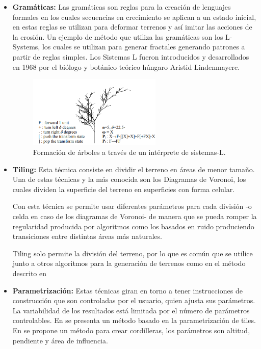 \begin{itemize}
            \item \textbf{Gramáticas:} 
            Las gramáticas son reglas para la creación de lenguajes formales en los cuales secuencias en crecimiento se aplican a un estado inicial, en \cite{Marak_97} estas reglas se utilizan para deformar terrenos y así imitar las acciones de la erosión.
            Un ejemplo de método que utiliza las gramáticas son los L-Systems, los cuales se utilizan para generar fractales generando patrones a partir de reglas simples. Los Sistemas L fueron introducidos y desarrollados en 1968 por el biólogo y botánico teórico húngaro Aristid Lindenmayerc.
                \begin{figure}[h]
                    \centering
                    \includegraphics[width=0.6\textwidth]{img/L-systems.png}
                    \caption{Formación de árboles a través de un intérprete de sistemas-L.}
                \end{figure}

            \item \textbf{Tiling:} 
            Esta técnica consiste en dividir el terreno en áreas de menor tamaño. Una de estas técnicas y la más conocida son los Diagramas de Voronoi, los cuales dividen la superficie del terreno en superficies con forma celular.
            
            Con esta técnica se permite usar diferentes parámetros para cada división -o celda en caso de los diagramas de Voronoi- de manera que se pueda romper la regularidad producida por algoritmos como los basados en ruido produciendo transiciones entre distintas áreas más naturales.

            Tiling solo permite la división del terreno, por lo que es común que se utilice junto a otros algoritmos para la generación de terrenos como en el método descrito en \cite{olsen2004realtime}
            
            \item \textbf{Parametrización:} Estas técnicas giran en torno a tener instrucciones de construcción que son controladas por el usuario, quien ajusta sus parámetros. La variabilidad de los resultados está limitada por el número de parámetros controlables. En \cite{Choros2016} se presenta un método basado en la parametrización de tiles. En \cite{Yin2013} se propone un método para crear cordilleras, los parámetros son altitud, pendiente y área de influencia.
            
            \end{itemize}

